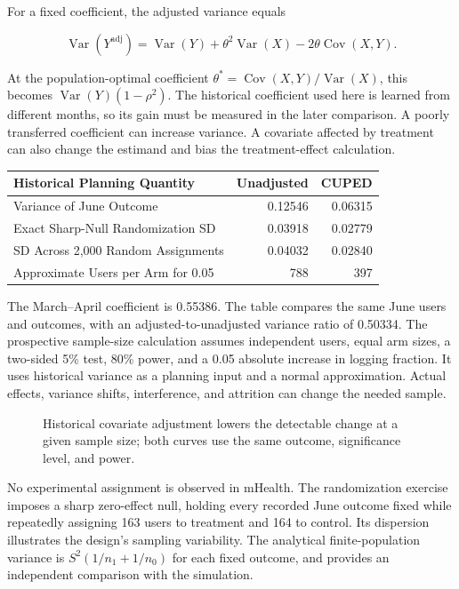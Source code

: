 For a fixed coefficient, the adjusted variance equals

\[
\operatorname{Var}(Y^{\mathrm{adj}})=\operatorname{Var}(Y)+\theta^2\operatorname{Var}(X)-2\theta\operatorname{Cov}(X,Y).
\]

At the population-optimal coefficient
\(\theta^*=\operatorname{Cov}(X,Y)/\operatorname{Var}(X)\), this becomes
\(\operatorname{Var}(Y)(1-\rho^2)\). The historical coefficient used
here is learned from different months, so its gain must be measured in
the later comparison. A poorly transferred coefficient can increase
variance. A covariate affected by treatment can also change the estimand
and bias the treatment-effect calculation.

\begin{table}[H]
\centering\small
\begin{tabular}{@{}lrr@{}}
\toprule
Historical Planning Quantity & Unadjusted & CUPED \\
\midrule

Variance of June Outcome & 0.12546 & 0.06315 \\
Exact Sharp-Null Randomization SD & 0.03918 & 0.02779 \\
SD Across 2,000 Random Assignments & 0.04032 & 0.02840 \\
Approximate Users per Arm for 0.05 & 788 & 397 \\
\bottomrule
\end{tabular}
\end{table}

The March--April coefficient is 0.55386. The table compares the same
June users and outcomes, with an adjusted-to-unadjusted variance ratio
of 0.50334. The prospective sample-size calculation assumes independent
users, equal arm sizes, a two-sided 5\% test, 80\% power, and a 0.05
absolute increase in logging fraction. It uses historical variance as a
planning input and a normal approximation. Actual effects, variance
shifts, interference, and attrition can change the needed sample.

\begin{figure}[htbp]
\centering

\caption{Historical covariate adjustment lowers the detectable change at a given sample size; both curves use the same outcome, significance level, and power.}\label{fig:M06_cuped_precision}
\end{figure}

No experimental assignment is observed in mHealth. The randomization
exercise imposes a sharp zero-effect null, holding every recorded June
outcome fixed while repeatedly assigning 163 users to treatment and 164
to control. Its dispersion illustrates the design's sampling
variability. The analytical finite-population variance is
\(S^2(1/n_1+1/n_0)\) for each fixed outcome, and provides an independent
comparison with the simulation.

